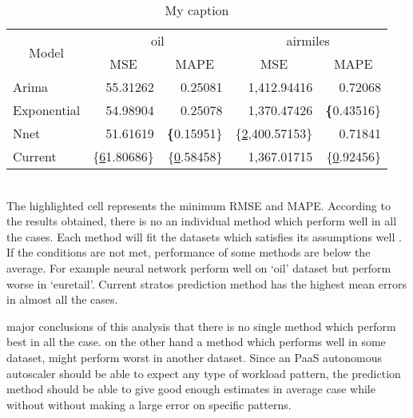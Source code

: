 \begin{table}[]
\centering
\caption{My caption}
\label{my-label}
\begin{tabular}{|l|r|r|r|r|}
\hline
\multicolumn{1}{|c|}{\multirow{2}{*}{Model}} & \multicolumn{2}{c|}{oil}                             & \multicolumn{2}{c|}{airmiles}                        \\ \cline{2-5} 
\multicolumn{1}{|c|}{}                       & \multicolumn{1}{c|}{MSE} & \multicolumn{1}{c|}{MAPE} & \multicolumn{1}{c|}{MSE} & \multicolumn{1}{c|}{MAPE} \\ \hline
Arima                                        & 55.31262                 & 0.25081                   & 1,412.94416              & 0.72068                   \\ \hline
Exponential                                  & 54.98904                 & 0.25078                   & 1,370.47426              & \textbf\{0.43516\}        \\ \hline
Nnet                                         & 51.61619                 & \textbf\{0.15951\}        & \{\ul 2,400.57153\}      & 0.71841                   \\ \hline
Current                                      & \{\ul 61.80686\}         & \{\ul 0.58458\}           & 1,367.01715              & \{\ul 0.92456\}           \\ \hline
\end{tabular}
\end{table}


\\The highlighted cell represents the minimum RMSE and MAPE. According to the results obtained, there is no an individual method which perform well in all the cases. Each method will fit the datasets which satisfies its assumptions well . If the conditions are not met, performance of some methods are below the average. For example neural network perform well on ‘oil’ dataset but perform worse in ‘euretail’.  Current stratos prediction method has the highest mean errors in almost all the cases.

major conclusions of this analysis that there is no single method which perform best in all the case. on the other hand a method which performs well in some dataset, might perform worst in another dataset.
Since an PaaS autonomous autoscaler should be able to expect any type of workload pattern, the prediction method should be able to give good enough estimates in average case while without without making a large error on specific patterns.

